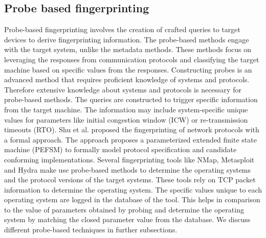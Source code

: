 \subsection{Probe based fingerprinting}
\label{Probe Based}
Probe-based fingerprinting involves the creation of crafted queries to target devices to derive fingerprinting information. The probe-based methods engage with the target system, unlike the metadata methods. These methods focus on leveraging the responses from communication protocols and classifying the target machine based on specific values from the responses. Constructing probes is an advanced method that requires proficient knowledge of systems and protocols. Therefore extensive knowledge about systems and protocols is necessary for probe-based methods. The queries are constructed to trigger specific information from the target machine. The information may include system-specific unique values for parameters like initial congestion window (ICW) or re-transmission timeouts (RTO). 
Shu et al.\cite{shu2006network} proposed the fingerprinting of network protocols with a formal approach. The approach proposes a parameterized extended finite state machine (PEFSM) to formally model protocol specification and candidate conforming implementations. Several fingerprinting tools like NMap, Metasploit and Hydra make use probe-based methods to determine the operating systems and the protocol versions of the target systems. These tools rely on TCP packet information to determine the operating system. The specific values unique to each operating system are logged in the database of the tool. This helps in comparison to the value of parameters obtained by probing and determine the operating system by matching the closed parameter value from the database. We discuss different probe-based techniques in further subsections.
\newline

